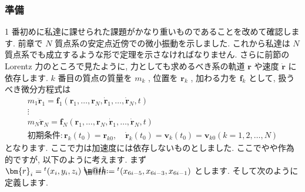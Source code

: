 \documentclass[openany, a4paper, oneside]{book}
\makeatletter
\newcommand*{\defeq}{\mathrel{\rlap{%
\raisebox{0.3ex}{$\m@th\cdot$}}%
\raisebox{-0.3ex}{$\m@th\cdot$}}%
=}
\theoremstyle{break}
\theoremstyle{breakdefn}
\makeatother
\begin{document}
\subsubsection{準備}
\label{sec-5-2-12-2-1}

1 番初めに私達に課せられた課題がかなり重いものであることを改めて確認します.
前章で $N$ 質点系の安定点近傍での微小振動を示しました.
これから私達は $N$ 質点系でも成立するような形で定理を示さなければなりません.
さらに前節の Lorentz 力のところで見たように,
力としても求めるべき系の軌道 $\bm{r}$ や速度 $\dot{ \bm{r} }$ に依存します.
$k$ 番目の質点の質量を $m_k$ , 位置を $\bm{r}_k$ , 加わる力を $\bm{f}_k$ として, 扱うべき微分方程式は
\begin{gather}
m_1 \ddot{ \bm{r} }_1 = \bm{f}_1 ( \bm{r}_1, \dots , \bm{r}_N , \dot{ \bm{r} }_1 , \dots , \dot{ \bm{r} }_N , t)\\
\vdots \\
m_N \ddot{ \bm{r} }_N = \bm{f}_N ( \bm{r}_1, \dots , \bm{r}_N , \dot{ \bm{r} }_1 , \dots , \dot{ \bm{r} }_N , t )\\
\text{初期条件}:
\bm{r}_k (t_0) = \bm{r}_{k0}
, \quad
\dot{ \bm{r} }_k (t_0) = \bm{v}_k ( t_0 ) = \bm{v}_{k0}
( k = 1 , 2 , \dots , N )
\end{gather}
となります.
ここで力は加速度には依存しないものとしました.
ここでやや作為的ですが, 以下のように考えます.
まず $\bm{r}_i = {^t}( x_i , y_i , z_i ) \defeq {^t} ( x_{6i-5} , x_{6i-3} , x_{6i-1} )$ とします.
そして次のように定義します.
\end{document}
